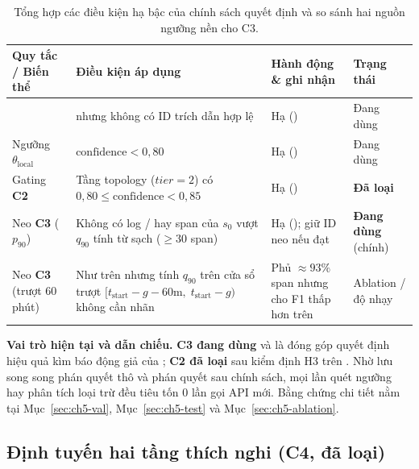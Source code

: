 \begin{table}[htbp]
  \centering
  \caption{Tổng hợp các điều kiện hạ bậc của chính sách quyết định và so sánh hai nguồn ngưỡng nền cho C3.}
  \label{tab:ch4-policy-rules}
  \footnotesize
  \begin{tabularx}{\linewidth}{@{}l Y Y l@{}}
    \toprule
    \textbf{Quy tắc / Biến thể} & \textbf{Điều kiện áp dụng} & \textbf{Hành động \& ghi nhận} & \textbf{Trạng thái} \\
    \midrule
     &  nhưng không có ID trích dẫn hợp lệ & Hạ  () & Đang dùng \\
    Ngưỡng $\theta_{\text{local}}$ & $\text{confidence} < 0{,}80$ & Hạ  () & Đang dùng \\
    Gating \textbf{C2} & Tầng topology ($tier = 2$) có $0{,}80 \le \text{confidence} < 0{,}85$ & Hạ  () & \textbf{Đã loại} \\
    Neo \textbf{C3} ( $p_{90}$) & Không có log / hay span của $s_0$ vượt $q_{90}$ tính từ  sạch ($\ge 30$ span) & Hạ  (); giữ ID neo nếu đạt & \textbf{Đang dùng} (chính) \\
    Neo \textbf{C3} (trượt 60 phút) & Như trên nhưng tính $q_{90}$ trên cửa sổ trượt $[t_{\text{start}} - g - 60\text{m},\; t_{\text{start}} - g)$ không cần nhãn & Phủ $\approx 93\%$ span nhưng cho F1 thấp hơn trên  & Ablation / độ nhạy \\
    \bottomrule
  \end{tabularx}
\end{table}

\textbf{Vai trò hiện tại và dẫn chiếu.} \textbf{C3 đang dùng} và là đóng góp quyết định hiệu quả kìm báo động giả của \CTAV{}; \textbf{C2 đã loại} sau kiểm định H3 trên . Nhờ lưu song song phán quyết thô và phán quyết sau chính sách, mọi lần quét ngưỡng hay phân tích loại trừ đều tiêu tốn $0$ lần gọi API mới. Bằng chứng chi tiết nằm tại Mục~\ref{sec:ch5-val}, Mục~\ref{sec:ch5-test} và Mục~\ref{sec:ch5-ablation}.

\subsection{Định tuyến hai tầng thích nghi (C4, đã loại)}
\label{sec:ch4-c4}

